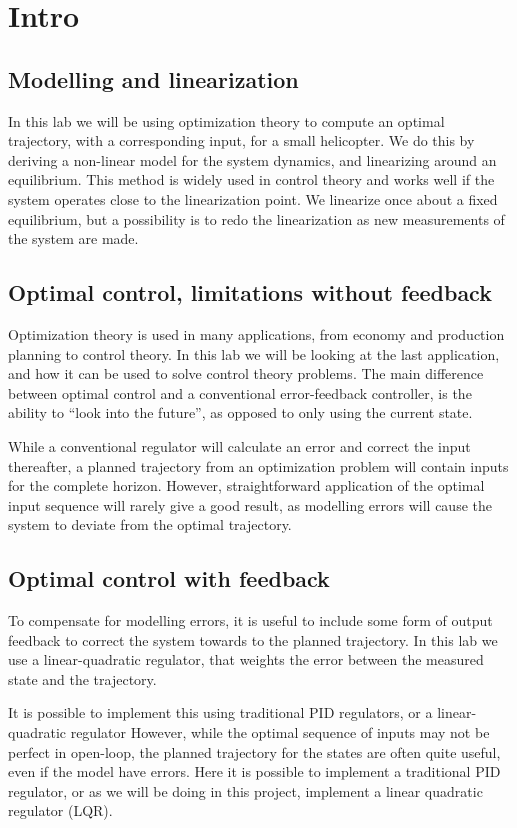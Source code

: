 \section{Intro}
\subsection{Modelling and linearization}
In this lab we will be using optimization theory to compute an optimal trajectory, with a corresponding input, for a small helicopter. We do this by deriving a non-linear model for
the system dynamics, and linearizing around an equilibrium. This method is widely used in
control theory and works well if the system operates close to the linearization point. We linearize once about a fixed equilibrium, but a possibility is to redo the linearization as new measurements of the system are made.

\subsection{Optimal control, limitations without feedback}
Optimization theory is used in many applications, from economy and production planning to control theory. In this lab we will be looking at the last application, and how it can be used to solve control theory problems. The main difference between optimal control and a conventional error-feedback controller, is the ability to ``look into the future'', as opposed to only using the current state.

While a conventional regulator will calculate an error and correct the input thereafter, a planned trajectory from an optimization problem will contain inputs for the complete horizon. However, straightforward application of the optimal input sequence will rarely give a good result, as modelling errors will cause the system to deviate from the optimal trajectory.

\subsection{Optimal control with feedback}
To compensate for modelling errors, it is useful to include some form of output feedback to correct
the system towards to the planned trajectory. In this lab we use a linear-quadratic regulator, that
weights the error between the measured state and the trajectory.

It is possible to implement this using traditional PID regulators, or a linear-quadratic regulator
However, while the optimal sequence of inputs may not be perfect in open-loop, the planned trajectory for the states are often quite useful, even if the model have errors. Here it is possible to implement a traditional PID regulator, or as we will be doing in this project, implement a linear quadratic regulator (LQR).

